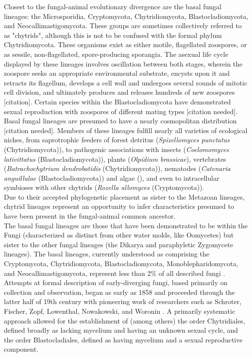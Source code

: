 \indent Closest to the fungal-animal evolutionary divergence are the basal fungal lineages: the Microsporidia, Cryptomycota, Chytridiomycota, Blastocladiomycota, and Neocallimastigomycota. These groups are sometimes collectively referred to as "chytrids", although this is not to be confused with the formal phylum Chytridiomycota. These organisms exist as either motile, flagellated zoospores, or as sessile, non-flagellated, spore-producing sporangia. The asexual life cycle displayed by these lineages involves oscillation between both stages, wherein the zoospore seeks an appropriate environmental substrate, encysts upon it and retracts its flagellum, develops a cell wall and undergoes several rounds of mitotic cell division, and ultimately produces and releases hundreds of new zoospores [citation]. Certain species within the Blastocladiomycota have demonstrated sexual reproduction with zoospores of different mating types [citation needed].\\
\indent Basal fungal lineages are presumed to have a nearly cosmopolitan distribution [citation needed]. Members of these lineages fulfill nearly all varieties of ecological niches, from saprotrophic feeders of forest detritus (\textit{Spizellomyces punctatus} (Chytridiomycota)), to pathogenic associations with insects (\textit{Coelomomyces lativittatus} (Blastocladiomycota)), plants (\textit{Olpidium brassicae}), vertebrates (\textit{Batrachochytrium dendrobatidis} (Chytridiomycota)), nematodes (\textit{Catenaria anguillulae} (Blastocladiomycota)) and algae (), and even to intracellular symbioses with other chytrids (\textit{Rozella allomyces} (Cryptomycota)). \\
\indent Due to their accepted phylogenetic placement as sister to the Metazoan lineages, chytrid lineages represent an opportunity to infer characteristics presumed to have been present in the fungal-animal common ancestor. \\
\indent The basal fungal lineages are those that have been demonstrated to be within the Fungi (characterized as distinct from other water molds, like Oomycetes) but sister to the other fungal lineages (the Dikarya and paraphyletic Zygomycete lineages). The basal lineages, currently understood as comprising the Cryptomycota, Chytridiomycota, Blastocladiomycota, Monoblepharidomycota, and Neocallimastigomycota, represent less than 2\% of all described fungi \cite{Stajich2009}. 
\indent Attempts at formal description of early-diverging fungi, based primarily on collection and observation, began as early as 1858 and proceeded through the latter half of 19th century with pioneering work of researchers such as Schroter, Fischer, Zopf, Lowenthal, Nowakowski, and Woronin \cite{lwerPhycomyces}. A primarily systematic approach allowed for the establishment of (among others) the order Chytridiales, defined broadly as lacking mycelium and having an unknown sexual cycle, and the order Blastocladiales, defined as having mycelium and a sexual reproductive component.\\
